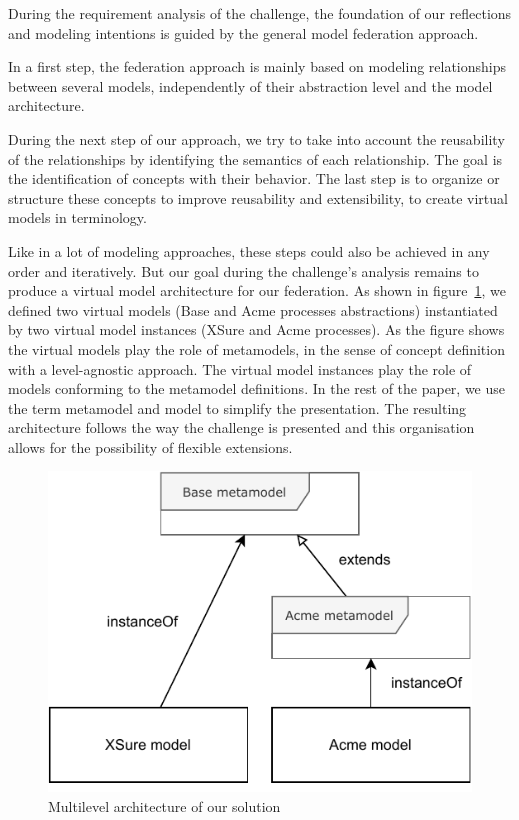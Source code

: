 
During the requirement analysis of the challenge, the foundation of our reflections and modeling intentions is guided by the general model federation approach. 

In a first step, the federation approach is mainly based on modeling relationships between several models, independently of their abstraction level and the model architecture.

During the next step of our approach, we try to take into account the reusability of the relationships by identifying the semantics of each relationship. The goal is the identification of concepts with their behavior. The last step is to organize or structure these concepts to improve reusability and extensibility, to create virtual models in \FML terminology.     

Like in a lot of modeling approaches, these  steps could also be achieved in any order and iteratively. But our goal during the challenge's analysis remains to produce a \FML virtual model architecture for our federation. 
As shown in figure~\ref{fig:MultilevelArchitecture}, we defined two virtual models (Base and Acme processes abstractions) instantiated by two virtual model instances (XSure and Acme processes). As the figure shows the virtual models play the role of metamodels, in the sense of concept definition with a level-agnostic approach. The virtual model instances play the role of models conforming to the metamodel definitions. In the rest of the paper, we use the term metamodel and model to simplify the presentation.
The resulting architecture follows the way the challenge is presented and this
organisation allows for the possibility of flexible extensions.


\begin{figure}[t]
    \centering
    \includegraphics[width=0.7 \columnwidth]{Figures/MultilevelArchitecture.pdf}
    \caption{Multilevel architecture of our solution}
    \label{fig:MultilevelArchitecture}
\end{figure}

